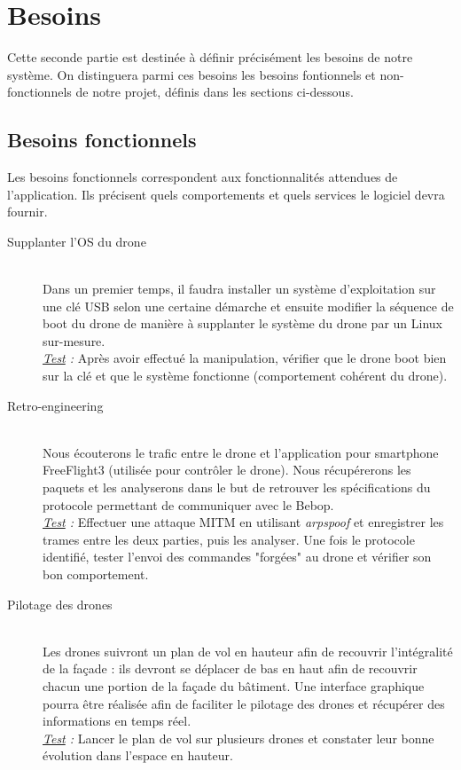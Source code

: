 \documentclass[12pt, openany]{report}
\begin{document}
\chapter{Besoins}
Cette seconde partie est destinée à définir précisément les besoins de notre système. On distinguera parmi ces besoins les besoins fontionnels et non-fonctionnels de notre projet, définis dans les sections ci-dessous.

\section{Besoins fonctionnels}
Les besoins fonctionnels correspondent aux fonctionnalités attendues de
l’application. Ils précisent quels comportements et quels services le logiciel
devra fournir.

\begin{description}
\item[Supplanter l'OS du drone] \hfill \\
Dans un premier temps, il faudra installer un système d'exploitation sur une clé USB selon une certaine démarche et ensuite modifier la séquence de boot du drone de manière à supplanter le système du drone par un Linux sur-mesure. \\
\textit{\underline{Test} :} Après avoir effectué la manipulation, vérifier que le drone boot bien sur la clé et que le système fonctionne (comportement cohérent du drone).

\item[Retro-engineering] \hfill \\
Nous écouterons le trafic entre le drone et l’application pour smartphone FreeFlight3 (utilisée pour contrôler le drone). Nous récupérerons les paquets et les analyserons dans le but de retrouver les spécifications du protocole permettant de communiquer avec le Bebop. \\
\textit{\underline{Test} :} Effectuer une attaque MITM en utilisant \textit{arpspoof} et enregistrer les trames entre les deux parties, puis les analyser. Une fois le protocole identifié, tester l'envoi des commandes "forgées" au drone et vérifier son bon comportement.

\item[Pilotage des drones] \hfill \\
Les drones suivront un plan de vol en hauteur afin de recouvrir l'intégralité de la façade : ils devront se déplacer de bas en haut afin de recouvrir chacun une portion de la façade du bâtiment. Une interface graphique pourra être réalisée afin de faciliter le pilotage des drones et récupérer des informations en temps réel.\\
\textit{\underline{Test} :} Lancer le plan de vol sur plusieurs drones et constater leur bonne évolution dans l'espace en hauteur.


\end{description}
\end{document}
